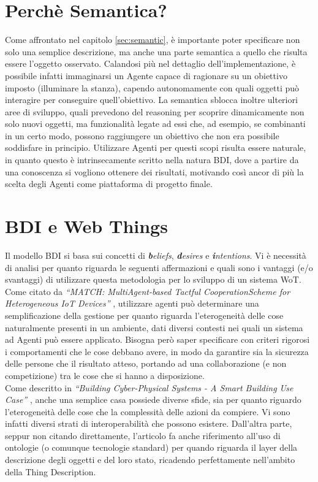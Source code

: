 \documentclass[12pt,a4paper,openright,oneside]{report}
\newcommand{\quotes}[1]{``#1''}
\begin{document}
\section{Perchè Semantica?}
Come affrontato nel capitolo \ref{sec:semantic}, è importante poter specificare non solo una semplice descrizione, ma anche una parte semantica a quello che risulta essere l'oggetto osservato. Calandosi più nel dettaglio dell'implementazione, è possibile infatti immaginarsi un Agente capace di ragionare su un obiettivo imposto (illuminare la stanza), capendo autonomamente con quali oggetti può interagire per conseguire quell'obiettivo. La semantica sblocca inoltre ulteriori aree di sviluppo, quali prevedono del reasoning per scoprire dinamicamente non solo nuovi oggetti, ma funzionalità legate ad essi che, ad esempio, se combinanti in un certo modo, possono raggiungere un obiettivo che non era possibile soddisfare in principio. Utilizzare Agenti per questi scopi risulta essere naturale, in quanto questo è intrinsecamente scritto nella natura BDI, dove a partire da una conoscenza si vogliono ottenere dei risultati, motivando così ancor di più la scelta degli Agenti come piattaforma di progetto finale.


\section{BDI e Web Things}
Il modello BDI si basa sui concetti di \textit{\textbf{b}eliefs}, \textit{\textbf{d}esires} e \textit{\textbf{i}ntentions}. Vi è necessità di analisi per quanto riguarda le seguenti affermazioni e quali sono i vantaggi (e/o svantaggi) di utilizzare questa metodologia per lo sviluppo di un sistema WoT.\\

Come citato da \textit{\quotes{MATCH: MultiAgent-based Tactful CooperationScheme for Heterogeneous IoT Devices}} \cite{masiot}, utilizzare agenti può determinare una semplificazione della gestione per quanto riguarda l'eterogeneità delle cose naturalmente presenti in un ambiente, dati diversi contesti nei quali un sistema ad Agenti può essere applicato. Bisogna però saper specificare con criteri rigorosi i comportamenti che le cose debbano avere, in modo da garantire sia la sicurezza delle persone che il risultato atteso, portando ad una collaborazione (e non competizione) tra le cose che si hanno a disposizione.\\

Come descritto in \textit{\quotes{Building Cyber-Physical Systems - A Smart Building Use Case}} \cite{smartbuilding}, anche una semplice casa possiede diverse sfide, sia per quanto riguardo l'eterogeneità delle cose che la complessità delle azioni da compiere. Vi sono infatti diversi strati di interoperabilità che possono esistere. Dall'altra parte, seppur non citando direttamente, l'articolo fa anche riferimento all'uso di ontologie (o comunque tecnologie standard) per quando riguarda il layer della descrizione degli oggetti e del loro stato, ricadendo perfettamente nell'ambito della Thing Description.\\
\end{document}

